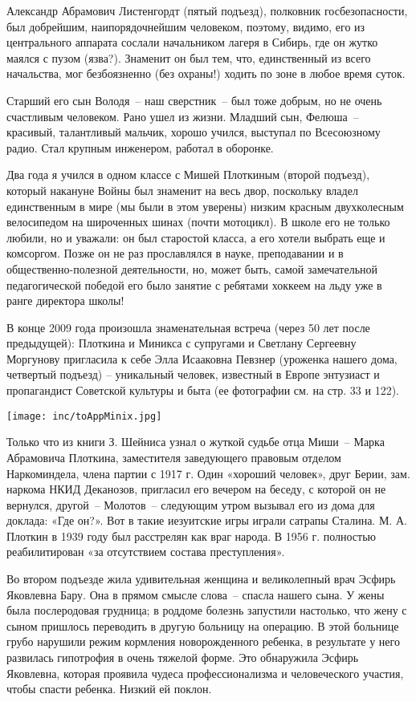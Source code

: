 Александр Абрамович Листенгордт (пятый подъезд), полковник госбезопасности, был добрейшим, наипорядочнейшим человеком, поэтому, видимо, его из центрального аппарата  сослали начальником лагеря  в Сибирь, где он жутко маялся с пузом (язва?). Знаменит он был тем, что, единственный из всего начальства, мог безбоязненно (без охраны!) ходить по зоне в любое время суток.


Старший его сын Володя~-- наш сверстник~-- был тоже добрым, но не очень счастливым человеком. Рано ушел из жизни. Младший сын, Фелюша~--  красивый, талантливый мальчик, хорошо учился, выступал по Всесоюзному радио. Стал крупным инженером, работал в оборонке.

Два года я учился в одном классе с Мишей Плоткиным (второй подъезд), который накануне Войны был знаменит на весь двор, поскольку владел единственным в мире (мы были в этом уверены) низким красным двухколесным велосипедом на широченных шинах (почти мотоцикл). В школе его не только любили, но и уважали: он был старостой класса, а его хотели выбрать еще и комсоргом. Позже он не раз прославлялся в науке, преподавании и в общественно-полезной деятельности, но, может быть, самой замечательной педагогической победой его было занятие с ребятами хоккеем на льду уже в ранге директора школы!

В конце 2009 года произошла знаменательная встреча (через 50 лет после предыдущей): Плоткина и Миникса с супругами и Светлану Сергеевну Моргунову пригласила к себе Элла Исааковна Певзнер (уроженка нашего дома, четвертый подъезд) – уникальный человек, известный в Европе энтузиаст и пропагандист Советской культуры и быта (ее фотографии см. на стр. 33 и 122).


\texttt{[image: inc/toAppMinix.jpg]}

Только что из книги З. Шейниса узнал о жуткой судьбе отца Миши~-- Марка Абрамовича Плоткина, заместителя заведующего правовым отделом Наркоминдела, члена партии с 1917 г. Один «хороший человек», друг Берии, зам. наркома НКИД Деканозов, пригласил его вечером на беседу, с которой он не вернулся, другой~-- Молотов~-- следующим утром вызывал его из дома для доклада: «Где он?». Вот в такие иезуитские игры играли сатрапы Сталина. М. А. Плоткин в 1939 году был расстрелян как враг народа. В 1956 г. полностью реабилитирован «за отсутствием состава преступления».  

Во втором подъезде жила удивительная женщина и великолепный врач Эсфирь Яковлевна Бару. Она в прямом смысле слова~-- спасла нашего сына. У жены была послеродовая грудница; в роддоме болезнь запустили настолько, что жену с сыном пришлось переводить в другую больницу на операцию. В этой больнице грубо нарушили режим кормления новорожденного ребенка, в результате у него развилась гипотрофия в очень тяжелой форме. Это обнаружила Эсфирь Яковлевна, которая проявила чудеса профессионализма и человеческого участия, чтобы спасти ребенка. Низкий ей поклон.

